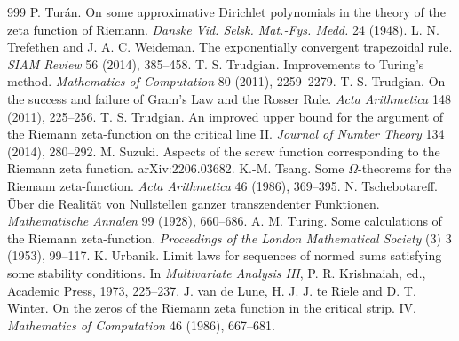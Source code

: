 \begin{thebibliography}{999}
 P. Tur\'an. On some approximative Dirichlet polynomials in the theory of the zeta function of Riemann. \emph{Danske Vid. Selsk. Mat.-Fys. Medd.} 24 (1948).
 L. N. Trefethen and J. A. C. Weideman. The exponentially convergent trapezoidal rule. \emph{SIAM Review} 56 (2014), 385--458.
 T. S. Trudgian. Improvements to Turing's method. \emph{Mathematics of Computation} 80 (2011), 2259--2279.
 T. S. Trudgian. On the success and failure of Gram's Law and the Rosser Rule. \emph{Acta Arithmetica} 148 (2011), 225--256.
 T. S. Trudgian. An improved upper bound for the argument of the Riemann zeta-function on the critical line II. \emph{Journal of Number Theory} 134 (2014), 280--292.
 M. Suzuki. Aspects of the screw function corresponding to the Riemann zeta function. arXiv:2206.03682.
 K.-M. Tsang. Some $\Omega$-theorems for the Riemann zeta-function. \emph{Acta Arithmetica} 46 (1986), 369--395.
 N. Tschebotareff. \"Uber die Realit\"at von Nullstellen ganzer transzendenter Funktionen. \emph{Mathematische Annalen} 99 (1928), 660--686.
 A. M. Turing. Some calculations of the Riemann zeta-function. \emph{Proceedings of the London Mathematical Society} (3) 3 (1953), 99--117.
 K. Urbanik. Limit laws for sequences of normed sums satisfying some stability conditions. In \emph{Multivariate Analysis III}, P. R. Krishnaiah, ed., Academic Press, 1973, 225--237.
 J. van de Lune, H. J. J. te Riele and D. T. Winter. On the zeros of the Riemann zeta function in the critical strip. IV. \emph{Mathematics of Computation} 46 (1986), 667--681.

\end{thebibliography}
